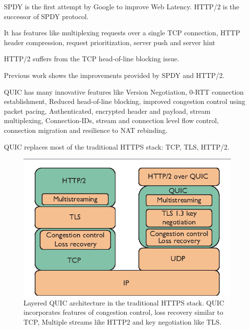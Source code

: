 \begin{frame}
SPDY is the first attempt by Google to improve Web Latency.\cite{spdy} HTTP/2 is the successor of SPDY protocol.

It has features like multiplexing requests over a single TCP connection, HTTP header compression, request prioritization, server push and server hint\cite{rfc7540}

HTTP/2 suffers from the TCP head-of-line blocking issue.

Previous work \cite{DBLP:conf/networking/El-khatibTW14}\cite{7745823}\cite{DBLP:conf/sac/CarlucciCM15}\cite{DBLP:conf/icc/MegyesiKM16} shows the improvements provided by SPDY and HTTP/2.  

    QUIC has many innovative features like Version Negotiation, 0-RTT connection establishment, Reduced head-of-line blocking, improved congestion control using packet pacing, Authenticated, encrypted header and payload, stream multiplexing, Connection-IDs, stream and connection level flow control, connection migration and resilience to NAT rebinding.\cite{ietf-quic-transport-18}

\end{frame}
\clearpage

\begin{frame}
QUIC replaces most of the traditional HTTPS stack: TCP, TLS, HTTP/2.
\begin{figure}[!t]
    
    \includegraphics[width=1\textwidth]
    {figures/QUICstack.png}
    \endminipage\hfill
    \caption{\label{fig:QUIC_architecture}Layered QUIC architecture in the traditional HTTPS stack. QUIC incorporates features of congestion control, loss recovery similar to TCP, Multiple streams like HTTP2 and key negotiation like TLS.\cite{Cui2017}}
    
\end{figure}
\end{frame}
\clearpage

